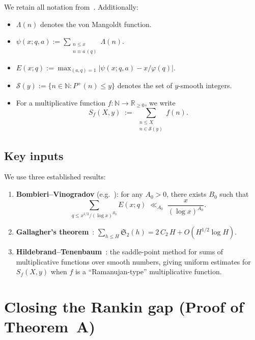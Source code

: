 \documentclass[11pt,reqno]{amsart}
\theoremstyle{plain}
\theoremstyle{definition}
\theoremstyle{remark}
\newcommand{\NN}{\mathbb{N}}
\newcommand{\RR}{\mathbb{R}}
\newcommand{\Sfrak}{\mathfrak{S}_2}
\newcommand{\Pplus}{P^{+}}
\newcommand{\Lam}{\Lambda}
\begin{document}
We retain all notation from~\cite{MT1}. Additionally:

\begin{itemize}[nosep]
  \item $\Lam(n)$ denotes the von Mangoldt function.
  \item $\psi(x;q,a) := \sum_{\substack{n \le x \\ n \equiv a\,(q)}}
    \Lam(n)$.
  \item $E(x;q) := \max_{(a,q)=1} |\psi(x;q,a) - x/\varphi(q)|$.
  \item $\mathcal{S}(y) := \{n \in \NN : \Pplus(n) \le y\}$
    denotes the set of $y$-smooth integers.
  \item For a multiplicative function $f \colon \NN \to \RR_{\ge 0}$,
    we write
    \[
      S_f(X,y) \;:=\; \sum_{\substack{n \le X \\ n \in \mathcal{S}(y)}}
      f(n).
    \]
\end{itemize}

\subsection{Key inputs}

We use three established results:

\begin{enumerate}[label=(I\arabic*),nosep]
  \item \textbf{Bombieri--Vinogradov} (e.g.~\cite{Davenport2000}):
    for any $A_0 > 0$, there exists $B_0$ such that
    \[
      \sum_{q \le x^{1/2}/(\log x)^{B_0}} E(x;q)
      \;\ll_{A_0}\; \frac{x}{(\log x)^{A_0}}.
    \]

  \item \textbf{Gallagher's theorem}~\cite{Gallagher1976}:
    $\sum_{h \le H} \Sfrak(h) = 2\,C_2\, H + O(H^{1/2} \log H)$.

  \item \textbf{Hildebrand--Tenenbaum}~\cite{HT1986}: the saddle-point
    method for sums of multiplicative functions over smooth numbers,
    giving uniform estimates for $S_f(X,y)$ when $f$ is a
    ``Ramanujan-type'' multiplicative function.
\end{enumerate}

\section{Closing the Rankin gap (Proof of Theorem~A)}
\label{sec:thmA}
\end{document}

